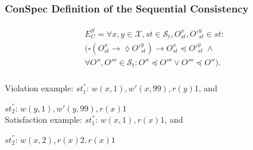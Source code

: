 \documentclass{beamer}
\begin{document}
\begin{frame}
\frametitle{ConSpec Definition of the Sequential Consistency}
\begin{align}\label{eqn:SC}
\begin{split}
E^S_C =  %
\forall x,y \in \mathcal{X}, \mathit{st} \in \mathcal{S}_t, O_\mathit{st}^x, O'^{y}_\mathit{st} \in \mathit{st}:  \\
\big( \square \left( O_\mathit{st}^x \rightarrow \lozenge O'^{y}_\mathit{st} \right)
\rightarrow O_\mathit{st}^x \preccurlyeq O'^{y}_\mathit{st}  \; \wedge
\\
\forall O'', O''' \in \mathcal{S}_t:
O'' \preccurlyeq O''' \vee O''' \preccurlyeq O'' \big). %
\end{split}
\end{align}\\

Violation example:
	$\mathit{st}_1^{''}$:   $w(x, 1), w'(x,99), r(y){1}$, and

$\mathit{st}_2^{''}$:  $w(y, 1), w'(y,99), r(x){1}$\\

Satisfaction example:
$\mathit{st}_1^{''}$:   $w(x, 1), r(x){1}$, and

$\mathit{st}_2^{''}$:  $w(x, 2), r(x){2}, r(x){1}$
\end{frame}
\end{document}
